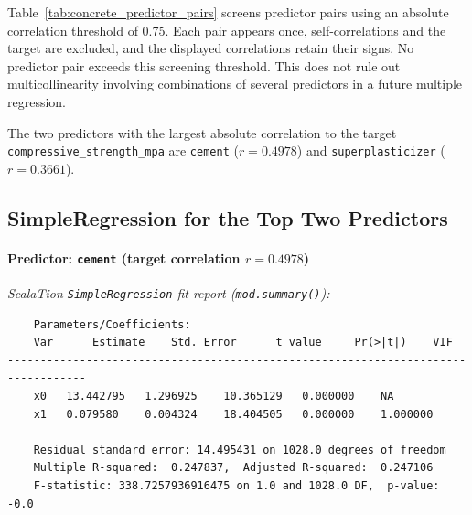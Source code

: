 \documentclass{article}
\begin{document}
Table~\ref{tab:concrete_predictor_pairs} screens predictor pairs using an absolute correlation threshold of 0.75. Each pair appears once, self-correlations and the target are excluded, and the displayed correlations retain their signs. No predictor pair exceeds this screening threshold. This does not rule out multicollinearity involving combinations of several predictors in a future multiple regression.

The two predictors with the largest absolute correlation to the target \texttt{compressive\_strength\_mpa} are \texttt{cement} ($r=0.4978$) and \texttt{superplasticizer} ($r=0.3661$).

\subsection{SimpleRegression for the Top Two Predictors}

\paragraph{Predictor: \texttt{cement} (target correlation $r = 0.4978$)}

\textit{ScalaTion \texttt{SimpleRegression} fit report (\texttt{mod.summary()}):}
\begin{verbatim}
    Parameters/Coefficients:
    Var      Estimate    Std. Error 	 t value 	 Pr(>|t|) 	 VIF
----------------------------------------------------------------------------------
    x0	 13.442795	 1.296925	 10.365129	 0.000000	 NA
    x1	 0.079580	 0.004324	 18.404505	 0.000000	 1.000000

    Residual standard error: 14.495431 on 1028.0 degrees of freedom
    Multiple R-squared:  0.247837,	Adjusted R-squared:  0.247106
    F-statistic: 338.7257936916475 on 1.0 and 1028.0 DF,  p-value: -0.0
\end{verbatim}
\end{document}

